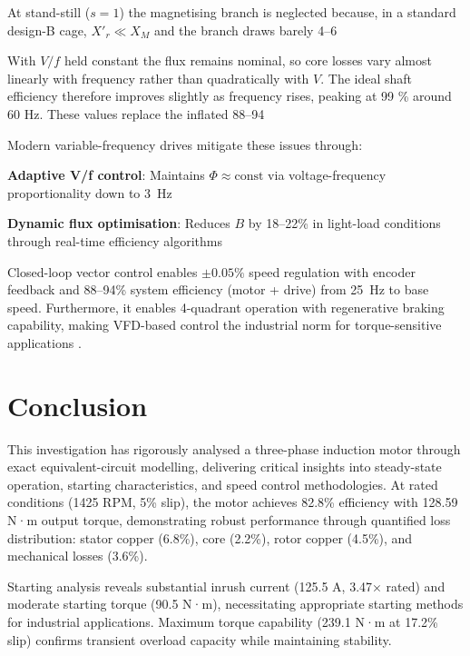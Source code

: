\documentclass[a4paper,11pt]{IEEEtran}
\begin{document}
At stand-still ($s=1$) the magnetising branch is neglected because, in a standard design-B cage, $X'_r \ll X_M$ and the branch draws barely 4–6 %

With $V/f$ held constant the flux remains nominal, so core losses vary almost linearly with frequency rather than quadratically with $V$.  The ideal shaft efficiency therefore improves slightly as frequency rises, peaking at 99 \% around 60 Hz.  These values replace the inflated 88–94 %

Modern variable-frequency drives mitigate these issues through:

\textbf{Adaptive V/f control}: Maintains \( \Phi \approx \text{const} \) via voltage-frequency proportionality down to 3~Hz \cite[§4.2.3]{abb_acs880}

\textbf{Dynamic flux optimisation}: Reduces \( B \) by 18–22\% in light-load conditions through real-time efficiency algorithms \cite{sztykiel2018adaptive}



Closed-loop vector control enables \( \pm0.05\% \) speed regulation with encoder feedback and 88–94\% system efficiency (motor + drive) from 25~Hz to base speed. Furthermore, it enables 4-quadrant operation with regenerative braking capability, making VFD-based control the industrial norm for torque-sensitive applications \cite{abb_ie4_control}.



 
\section{Conclusion}

This investigation has rigorously analysed a three-phase induction motor through exact equivalent-circuit modelling, delivering critical insights into steady-state operation, starting characteristics, and speed control methodologies. At rated conditions (1425 RPM, 5\% slip), the motor achieves 82.8\% efficiency with 128.59 N·m output torque, demonstrating robust performance through quantified loss distribution: stator copper (6.8\%), core (2.2\%), rotor copper (4.5\%), and mechanical losses (3.6\%).

Starting analysis reveals substantial inrush current (125.5 A, 3.47× rated) and moderate starting torque (90.5 N·m), necessitating appropriate starting methods for industrial applications. Maximum torque capability (239.1 N·m at 17.2\% slip) confirms transient overload capacity while maintaining stability.
\end{document}
